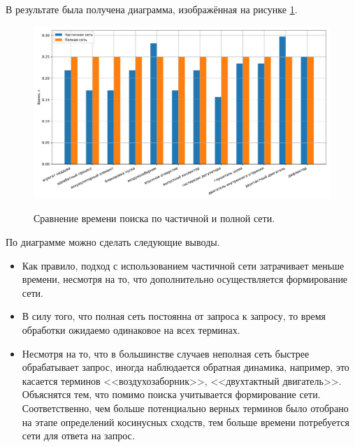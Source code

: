 В результате была получена диаграмма, изображённая на рисунке \ref{fig403:image}.
\begin{figure}[h!]
	\begin{center}
		{\includegraphics[scale = 0.54]{img/research/time.pdf}}
		\caption{Сравнение времени поиска по частичной и полной сети.}
		\label{fig403:image}
	\end{center}
\end{figure}

По диаграмме можно сделать следующие выводы.
\begin{itemize}
	\item Как правило, подход с использованием частичной сети затрачивает меньше времени, несмотря на то, что дополнительно осуществляется формирование сети.
	
	\item В силу того, что полная сеть постоянна от запроса к запросу, то время обработки ожидаемо одинаковое на всех терминах.
	
	\item Несмотря на то, что в большинстве случаев неполная сеть быстрее обрабатывает запрос, иногда наблюдается обратная динамика, например, это касается терминов <<воздухозаборник>>, <<двухтактный двигатель>>. Объяснятся тем, что помимо поиска учитывается формирование сети. Соответственно, чем больше потенциально верных терминов было отобрано на этапе определений косинусных сходств, тем больше времени потребуется сети для ответа на запрос. \\
\end{itemize}
 
